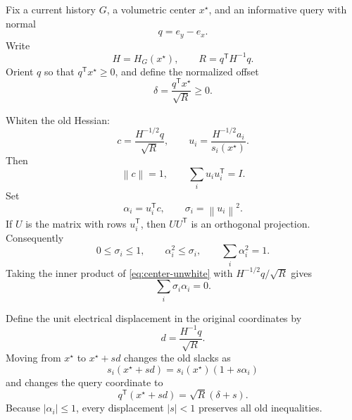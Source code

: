 \documentclass[11pt]{article}
\theoremstyle{definition}
\newcommand{\norm}[1]{\left\lVert #1\right\rVert}
\begin{document}
Fix a current history $G$, a volumetric center $x^\star$, and an informative query with normal
\[
  q=e_y-e_x.
\]
Write
\begin{equation}
  H=H_G(x^\star),
  \qquad
  R=q^{\mathsf T}H^{-1}q.
  \label{eq:R}
\end{equation}
Orient $q$ so that $q^{\mathsf T}x^\star\ge0$, and define the normalized offset
\begin{equation}
  \delta=\frac{q^{\mathsf T}x^\star}{\sqrt R}\ge0.
  \label{eq:delta}
\end{equation}

Whiten the old Hessian:
\begin{equation}
  c=\frac{H^{-1/2}q}{\sqrt R},
  \qquad
  u_i=\frac{H^{-1/2}a_i}{s_i(x^\star)}.
  \label{eq:whiten}
\end{equation}
Then
\begin{equation}
  \norm{c}=1,
  \qquad
  \sum_i u_i u_i^{\mathsf T}=I.
  \label{eq:isotropy}
\end{equation}
Set
\begin{equation}
  \alpha_i=u_i^{\mathsf T}c,
  \qquad
  \sigma_i=\norm{u_i}^2.
  \label{eq:alphasigma}
\end{equation}
If $U$ is the matrix with rows $u_i^{\mathsf T}$, then $UU^{\mathsf T}$ is an orthogonal projection.  Consequently
\begin{equation}
  0\le\sigma_i\le1,
  \qquad
  \alpha_i^2\le\sigma_i,
  \qquad
  \sum_i\alpha_i^2=1.
  \label{eq:frame-identities}
\end{equation}
Taking the inner product of \cref{eq:center-unwhite} with $H^{-1/2}q/\sqrt R$ gives
\begin{equation}
  \boxed{\sum_i\sigma_i\alpha_i=0.}
  \label{eq:center-alpha}
\end{equation}

Define the unit electrical displacement in the original coordinates by
\begin{equation}
  d=\frac{H^{-1}q}{\sqrt R}.
  \label{eq:direction}
\end{equation}
Moving from $x^\star$ to $x^\star+s d$ changes the old slacks as
\begin{equation}
  s_i(x^\star+s d)=s_i(x^\star)(1+s\alpha_i)
  \label{eq:slack-move}
\end{equation}
and changes the query coordinate to
\begin{equation}
  q^{\mathsf T}(x^\star+s d)=\sqrt R(\delta+s).
  \label{eq:query-move}
\end{equation}
Because $|\alpha_i|\le1$, every displacement $|s|<1$ preserves all old inequalities.
\end{document}
